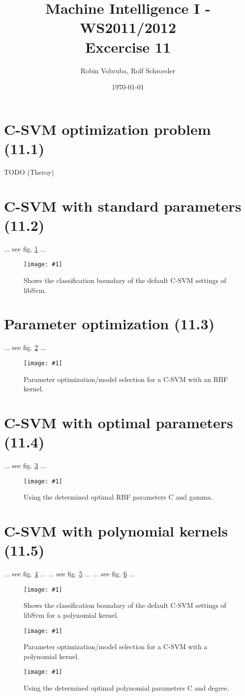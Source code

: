 \documentclass[a4paper,headings=small]{scrartcl}
\title{Machine Intelligence I - WS2011/2012\\Excercise 11}
\author{Robin Vobruba, Rolf Schroeder} %
\date{\today}
\newcommand{\image}[3]{
	\begin{figure}[htbp]
		\centering
		\texttt{[image: \#1]}
		\caption{#3}
		\label{fig:#1}
	\end{figure}
}
\begin{document}
\maketitle


\section{C-SVM optimization problem (11.1)}

TODO (Theroy)


\section{C-SVM with standard parameters (11.2)}

... see fig. \ref{fig:out_classifierSvm_cSvmDefault} ...

\image{out_classifierSvm_cSvmDefault}{0.9}%
	{Shows the classification boundary of the default C-SVM settings of libSvm.}


\section{Parameter optimization (11.3)}

... see fig. \ref{fig:out_cSvmRbfParameterOptimization} ...

\image{out_cSvmRbfParameterOptimization}{0.9}%
	{Parameter optimization/model selection for a C-SVM with an RBF kernel.}


\section{C-SVM with optimal parameters (11.4)}

... see fig. \ref{fig:out_classifierSvm_cSvmRbfOptimalParams} ...

\image{out_classifierSvm_cSvmRbfOptimalParams}{0.9}%
	{Using the determined optimal RBF parameters C and gamma.}


\section{C-SVM with polynomial kernels (11.5)}

... see fig. \ref{fig:out_classifierSvm_cSvmPolyDefault} ...
... see fig. \ref{fig:out_cSvmPolyParameterOptimization} ...
... see fig. \ref{fig:out_classifierSvm_cSvmPolyOptimalParams} ...

\image{out_classifierSvm_cSvmPolyDefault}{0.9}%
	{Shows the classification boundary of the default C-SVM settings of libSvm for a polynomial kernel.}

\image{out_cSvmPolyParameterOptimization}{0.9}%
	{Parameter optimization/model selection for a C-SVM with a polynomial kernel.}

\image{out_classifierSvm_cSvmPolyOptimalParams}{0.9}%
	{Using the determined optimal polynomial parameters C and degree.}
\end{document}
